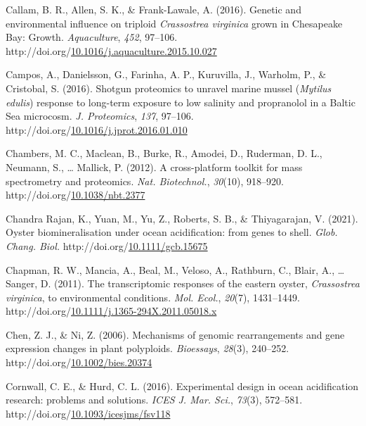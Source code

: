 \documentclass [11pt, proquest] {uwthesis}[2015/03/03]
\newlength{\cslhangindent}
\newenvironment{CSLReferences}%
{\setlength{\parindent}{0pt}%
\everypar{\setlength{\hangindent}{\cslhangindent}}\ignorespaces}%
{\par}
\begin{document}
\begin{CSLReferences}{1}{0}
\leavevmode\hypertarget{ref-Callam2016}{}%
Callam, B. R., Allen, S. K., \& Frank-Lawale, A. (2016). {Genetic and environmental influence on triploid \emph{Crassostrea virginica} grown in Chesapeake Bay: Growth}. \emph{Aquaculture}, \emph{452}, 97--106. http://doi.org/\href{https://doi.org/10.1016/j.aquaculture.2015.10.027}{10.1016/j.aquaculture.2015.10.027}

\leavevmode\hypertarget{ref-Campos2016}{}%
Campos, A., Danielsson, G., Farinha, A. P., Kuruvilla, J., Warholm, P., \& Cristobal, S. (2016). {Shotgun proteomics to unravel marine mussel (\emph{Mytilus edulis}) response to long-term exposure to low salinity and propranolol in a Baltic Sea microcosm}. \emph{J. Proteomics}, \emph{137}, 97--106. http://doi.org/\href{https://doi.org/10.1016/j.jprot.2016.01.010}{10.1016/j.jprot.2016.01.010}

\leavevmode\hypertarget{ref-Chambers2012}{}%
Chambers, M. C., Maclean, B., Burke, R., Amodei, D., Ruderman, D. L., Neumann, S., \ldots{} Mallick, P. (2012). {A cross-platform toolkit for mass spectrometry and proteomics}. \emph{Nat. Biotechnol.}, \emph{30}(10), 918--920. http://doi.org/\href{https://doi.org/10.1038/nbt.2377}{10.1038/nbt.2377}

\leavevmode\hypertarget{ref-ChandraRajan2021}{}%
Chandra Rajan, K., Yuan, M., Yu, Z., Roberts, S. B., \& Thiyagarajan, V. (2021). {Oyster biomineralisation under ocean acidification: from genes to shell}. \emph{Glob. Chang. Biol.} http://doi.org/\href{https://doi.org/10.1111/gcb.15675}{10.1111/gcb.15675}

\leavevmode\hypertarget{ref-Chapman2011}{}%
Chapman, R. W., Mancia, A., Beal, M., Veloso, A., Rathburn, C., Blair, A., \ldots{} Sanger, D. (2011). {The transcriptomic responses of the eastern oyster, \emph{Crassostrea virginica}, to environmental conditions}. \emph{Mol. Ecol.}, \emph{20}(7), 1431--1449. http://doi.org/\href{https://doi.org/10.1111/j.1365-294X.2011.05018.x}{10.1111/j.1365-294X.2011.05018.x}

\leavevmode\hypertarget{ref-Chen2006}{}%
Chen, Z. J., \& Ni, Z. (2006). {Mechanisms of genomic rearrangements and gene expression changes in plant polyploids}. \emph{Bioessays}, \emph{28}(3), 240--252. http://doi.org/\href{https://doi.org/10.1002/bies.20374}{10.1002/bies.20374}

\leavevmode\hypertarget{ref-Cornwall2016}{}%
Cornwall, C. E., \& Hurd, C. L. (2016). {Experimental design in ocean acidification research: problems and solutions}. \emph{ICES J. Mar. Sci.}, \emph{73}(3), 572--581. http://doi.org/\href{https://doi.org/10.1093/icesjms/fsv118}{10.1093/icesjms/fsv118}


\end{CSLReferences}
\end{document}

